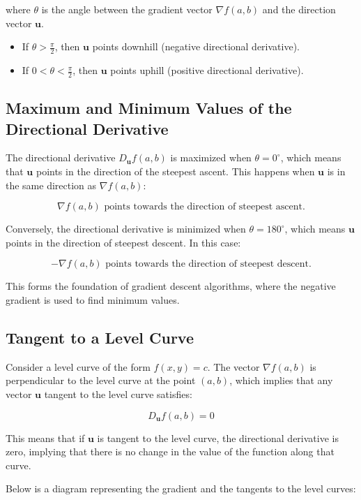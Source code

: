 \documentclass{report}
\begin{document}
where $\theta$ is the angle between the gradient vector $\nabla f(a, b)$ and the direction vector $\mathbf{u}$.

\begin{itemize}
	\item If $\theta > \frac{\pi}{2}$, then $\mathbf{u}$ points downhill (negative directional derivative).
	\item If $0 < \theta < \frac{\pi}{2}$, then $\mathbf{u}$ points uphill (positive directional derivative).
\end{itemize}

\subsection{Maximum and Minimum Values of the Directional Derivative}

The directional derivative $D_{\mathbf{u}} f(a, b)$ is maximized when $\theta = 0^\circ$, which means that $\mathbf{u}$ points in the direction of the steepest ascent. This happens when $\mathbf{u}$ is in the same direction as $\nabla f(a, b)$:

\[
	\nabla f(a, b) \text{ points towards the direction of steepest ascent.}
\]

Conversely, the directional derivative is minimized when $\theta = 180^\circ$, which means $\mathbf{u}$ points in the direction of steepest descent. In this case:

\[
	-\nabla f(a, b) \text{ points towards the direction of steepest descent.}
\]

This forms the foundation of gradient descent algorithms, where the negative gradient is used to find minimum values.

\subsection{Tangent to a Level Curve}

Consider a level curve of the form $f(x, y) = c$. The vector $\nabla f(a, b)$ is perpendicular to the level curve at the point $(a, b)$, which implies that any vector $\mathbf{u}$ tangent to the level curve satisfies:

\[
	D_{\mathbf{u}} f(a, b) = 0
\]

This means that if $\mathbf{u}$ is tangent to the level curve, the directional derivative is zero, implying that there is no change in the value of the function along that curve.

Below is a diagram representing the gradient and the tangents to the level curves:
\end{document}
